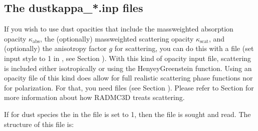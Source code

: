 \documentclass[letterpaper,10pt,english]{sphinxmanual}
\begin{document}
\subsection{The dustkappa\_*.inp files}
\label{\detokenize{inputoutputfiles:the-dustkappa-inp-files}}\label{\detokenize{inputoutputfiles:sec-dustkappa-files}}
If you wish to use dust opacities that include the mass\sphinxhyphen{}weighted absorption
opacity \(\kappa_{\mathrm{abs}}\), the (optionally) mass\sphinxhyphen{}weighted scattering
opacity \(\kappa_{\mathrm{scat}}\), and (optionally) the anisotropy factor \(g\)
for scattering, you can do this with a file  (set input style to 1 in
, see Section {\hyperref[\detokenize{inputoutputfiles:sec-dustopac-inp-file}]{}}). With this kind of
opacity input file, scattering is included either isotropically or using the
Henyey\sphinxhyphen{}Greenstein function.  Using an opacity file of this kind does 
allow for full realistic scattering phase functions nor for
polarization. For that, you need 
files (see Section {\hyperref[\detokenize{inputoutputfiles:sec-dustkapscatmat-files}]{}}). Please refer to Section
{\hyperref[\detokenize{dustradtrans:sec-scattering}]{}} for more information about how RADMC\sphinxhyphen{}3D treats
scattering.

If for dust species  the  in the  file
is set to 1, then the file  is sought and read. The
structure of this file is:

\begin{sphinxVerbatim}[commandchars=\\\{\}]
                          
\PYG{p}{[}\PYG{p}{]}        \PYG{p}{[}\PYG{p}{]}       \PYG{p}{[}\PYG{p}{]}      \PYG{p}{[}\PYG{p}{]}
                                                     
                                                     
\PYG{p}{[}\PYG{p}{]}    \PYG{p}{[}\PYG{p}{]}   \PYG{p}{[}\PYG{p}{]}    \PYG{p}{[}\PYG{p}{]}
\end{sphinxVerbatim}
\end{document}
